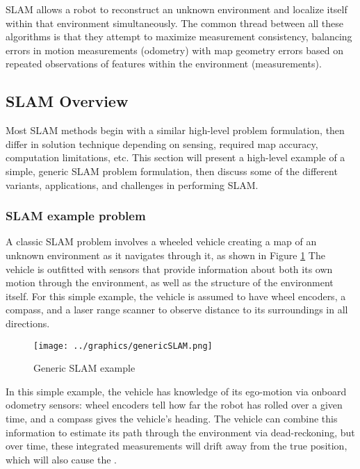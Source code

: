 SLAM allows a robot to reconstruct an unknown environment and localize itself within that environment simultaneously.  The common thread between all these algorithms is that they attempt to maximize measurement consistency, balancing errors in motion measurements (odometry) with map geometry errors based on repeated observations of features within the environment (measurements).

\subsection{SLAM Overview}

Most SLAM methods begin with a similar high-level problem formulation, then differ in solution technique depending on sensing, required map accuracy, computation limitations, etc. This section will present a high-level example of a simple, generic SLAM problem formulation, then discuss some of the different variants, applications, and challenges in performing SLAM. 

\subsubsection{SLAM example problem}
\label{sec:genericSLAM}
A classic SLAM problem involves a wheeled vehicle creating a map of an unknown environment as it navigates through it, as shown in Figure \ref{fig:GenericSLAM} The vehicle is outfitted with sensors that provide information about both its own motion through the environment, as well as the structure of the environment itself. For this simple example, the vehicle is assumed to have wheel encoders, a compass, and a laser range scanner to observe distance to its surroundings in all directions.

 \begin{figure}[!htb]
   \centering
   \texttt{[image: ../graphics/genericSLAM.png]} %
   \caption{ Generic SLAM example}
   \label{fig:GenericSLAM}
\end{figure}


In this simple example, the vehicle has knowledge of its ego-motion via onboard odometry sensors: wheel encoders tell how far the robot has rolled over a given time, and a compass gives the vehicle's heading. The vehicle can combine this information to estimate its path through the environment via dead-reckoning, but over time, these integrated measurements will drift away from the true position, which will also cause the .

